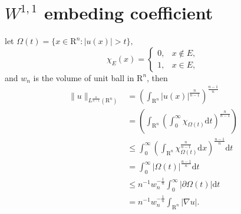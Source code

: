 \section{\texorpdfstring{$W^{1,1}$}{} embeding coefficient}
let $\Omega(t) = \{x\in\mathrm{R}^n : |u(x)| > t\},$ 
\begin{equation}
	\chi_E(x)=
	\begin{cases}
		0,& x\not\in E,\\
		1,& x\in E,
	\end{cases}
\end{equation}
and $w_n$ is the volume of unit ball in $\mathrm{R}^n$, then
\begin{equation}
	\begin{split}
		\|u\|_{L^{\frac{n}{n-1}}(\mathrm{R}^n)} &= \left(\int_{\mathrm{R}^n}|u(x)|^\frac{n}{n-1}\right)^{\frac{n-1}{n}}\\
		&= \left(\int_{\mathrm{R}^n}\left(\int_{0}^{\infty}\chi_{\Omega(t)}\mathrm{d}t\right)^{\frac{n}{n-1}}\right)\\
		&\leqslant \int_0^\infty\left(\int_{\mathrm{R}^n}\chi_{\Omega(t)}^{\frac{n}{n-1}}\mathrm{d}x\right)^{\frac{n-1}{n}}\mathrm{d}t\\
		&= \int_0^{\infty}|\Omega(t)|^{\frac{n-1}{n}}\mathrm{d}t\\
		&\leqslant n^{-1}w_n^{-\frac{1}{n}}\int_0^{\infty}|\partial\Omega(t)|\mathrm{d}t\\
		&= n^{-1}w_n^{-\frac{1}{n}} \int_{\mathrm{R}^n}|\nabla u|.
	\end{split}
\end{equation}


